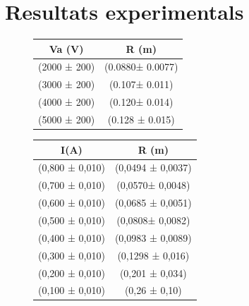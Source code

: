 \documentclass[11pt]{article}
\begin{document}
\section{Resultats experimentals}
\begin{figure}[h]
    \centering
    \begin{minipage}{0.45\textwidth}
        \centering
        \begin{tabular}{|c|c|}
            \hline
            Va (V)	&	R (m)	\\\hline
            (2000 ± 200)	&	(0.0880± 0.0077)	\\\hline
            (3000 ± 200)	&	(0.107± 0.011)	\\\hline
            (4000 ± 200)	&	(0.120± 0.014)	\\\hline
            (5000 ± 200)	&	(0.128 ± 0.015)	\\\hline
            
        \end{tabular}
        \label{tab:RvsVa}
    \end{minipage}
    \hfill
    \begin{minipage}{0.45\textwidth} 
        \centering
        \begin{tabular}{|c|c|}
            \hline
            I(A)	&	R (m)	\\\hline
            (0,800 ± 0,010)	&	(0,0494 ± 0,0037)	\\\hline
            (0,700 ± 0,010)	&	(0,0570± 0,0048)	\\\hline
            (0,600 ± 0,010)	&	(0,0685 ± 0,0051)	\\\hline
            (0,500 ± 0,010)	&	(0,0808± 0,0082)	\\\hline
            (0,400 ± 0,010)	&	(0,0983 ± 0,0089)	\\\hline
            (0,300 ± 0,010)	&	(0,1298 ± 0,016)	\\\hline
            (0,200 ± 0,010)	&	(0,201 ± 0,034)	\\\hline
            (0,100 ± 0,010)	&	(0,26 ± 0,10)	\\\hline
            
        \end{tabular}
        \label{tab:RvsI}
    \end{minipage}
\end{figure}
\end{document}

